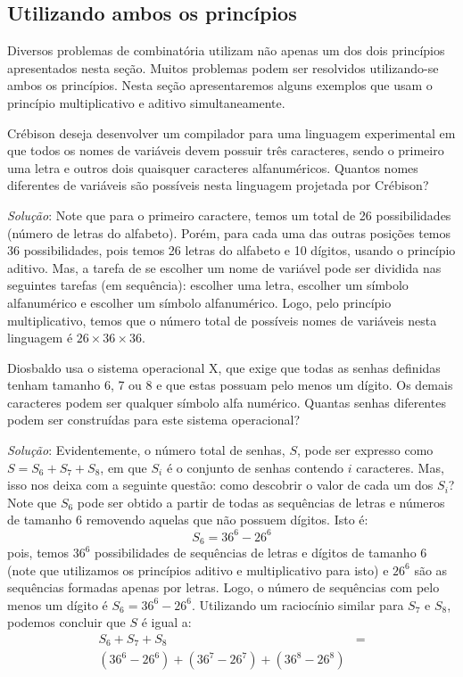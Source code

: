 \subsection{Utilizando ambos os princípios}

Diversos problemas de combinatória utilizam não apenas um dos dois
princípios apresentados nesta seção. Muitos problemas podem ser
resolvidos utilizando-se ambos os princípios. Nesta seção
apresentaremos alguns exemplos que usam o princípio multiplicativo e
aditivo simultaneamente.

\begin{Example}
Crébison deseja desenvolver um compilador para uma linguagem
experimental em que todos os nomes de variáveis devem possuir três
caracteres, sendo o primeiro uma letra e outros dois quaisquer
caracteres alfanuméricos. Quantos nomes diferentes de variáveis são
possíveis nesta linguagem projetada por Crébison?

\textit{Solução}: Note que para o primeiro caractere, temos um total
de 26 possibilidades (número de letras do alfabeto). Porém, para cada
uma das outras posições temos 36 possibilidades, pois temos 26 letras do alfabeto
e 10 dígitos, usando o princípio aditivo. Mas, a tarefa de se escolher
um nome de variável pode ser dividida nas seguintes tarefas (em
sequência): escolher uma letra, escolher um símbolo alfanumérico e
escolher um símbolo alfanumérico. Logo, pelo princípio multiplicativo,
temos que o número total de possíveis nomes de variáveis nesta
linguagem é $26 \times 36 \times 36$.
\end{Example}

\begin{Example}
Diosbaldo usa o sistema operacional X, que exige que todas as senhas
definidas tenham tamanho 6, 7 ou 8 e que estas possuam pelo menos um
dígito. Os demais caracteres podem ser qualquer símbolo alfa numérico. Quantas senhas
diferentes podem ser construídas para este sistema operacional?

\textit{Solução}: Evidentemente, o número total de senhas, $S$, pode
ser expresso como $S = S_6 + S_7 + S_8$, em que $S_i$ é o conjunto de
senhas contendo $i$ caracteres. Mas, isso nos deixa com a seguinte
questão: como descobrir o valor de cada um dos $S_i$? Note que $S_6$
pode ser obtido a partir de todas as sequências de letras e números de
tamanho 6 removendo aquelas que não possuem dígitos. Isto é:
\[S_6 = 36^6 - 26^6\]
pois, temos $36^6$ possibilidades de sequências de letras e dígitos de
tamanho 6 (note que utilizamos os princípios aditivo e multiplicativo
para isto) e $26^6$ são as sequências formadas apenas por
letras. Logo,  o número de sequências com pelo menos um dígito é
$S_6 = 36^6 - 26^6$. Utilizando um raciocínio similar para $S_7$ e
$S_8$, podemos concluir que $S$ é igual a:
\[
\begin{array}{lc}
S_6 + S_7 + S_8 & =\\
(36^6 - 26^6) + (36^7 - 26^7) + (36^8 - 26^8)
\end{array}
\]
\end{Example}

